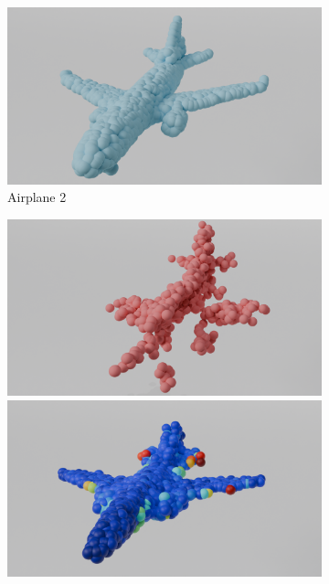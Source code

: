 \begin{figure}[htb]
\begin{subfigure}[t]{0.315\textwidth}
        \includegraphics[width=\textwidth]{figures/com_ap2.png}
        \caption{Airplane 2}
    \end{subfigure}\hfill
    \begin{subfigure}[t]{0.315\textwidth}
        \includegraphics[width=\textwidth]{figures/part_ap3.png}
        \includegraphics[width=\textwidth]{figures/dc_lin_ap3.png}

\end{subfigure}
\end{figure}
